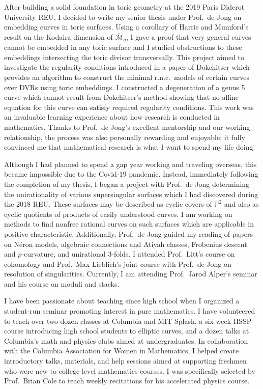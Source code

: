\documentclass[11pt]{article}
\begin{document}
\par
After building a solid foundation in toric geometry at the 2019 Paris Diderot University REU, I decided to write my senior thesis under Prof.\ de Jong on embedding curves in toric surfaces. Using a corollary of Harris and Mumford's result on the Kodaira dimension of $\overline{\mathcal{M}}_g$, I gave a proof that very general curves cannot be embedded in any toric surface and I studied obstructions to these embeddings intersecting the toric divisor transversally. This project aimed to investigate the regularity conditions introduced in a paper of Dokchitser  which provides an algorithm to construct the minimal r.n.c.\ models of certain curves over DVRs using toric embeddings. I constructed a degeneration of a genus 5 curve which cannot result from Dokchitser's method showing that no affine equation for this curve can satisfy required regularity conditions. This work was an invaluable learning experience about how research is conducted in mathematics. Thanks to Prof.\ de Jong’s excellent mentorship and our working relationship, the process was also personally rewarding and enjoyable; it fully convinced me that mathematical research is what I want to spend my life doing. 
\par 
Although I had planned to spend a gap year working and traveling overseas, this became impossible due to the Covid-19 pandemic. Instead, immediately following the completion of my thesis, I began a project with Prof.\ de Jong determining the unirationality of various supersingular surfaces which I had discovered during the 2018 REU. These surfaces may be described as cyclic covers of $\mathbb{P}^2$ and also as cyclic quotients of products of easily understood curves. I am working on methods to find nonfree rational curves on such surfaces which are applicable in positive characteristic. Additionally, Prof.\ de Jong guided my reading of papers on N\'{e}ron models, algebraic connections and Atiyah classes, Frobenius descent and $p$-curvature, and unirational $3$-folds. I attended Prof.\ Litt's course on \etale cohomology and Prof.\ Max Lieblich's joint course with Prof.\ de Jong on resolution of singularities. Currently, I am attending Prof.\ Jarod Alper’s seminar and his course on moduli and stacks.
\par
I have been passionate about teaching since high school when I organized a student-run seminar promoting interest in pure mathematics. I have volunteered to teach over two dozen classes at Columbia and MIT Splash, a six-week HSSP course introducing high school students to elliptic curves, and a dozen talks at Columbia's math and physics clubs aimed at undergraduates. In collaboration with the Columbia Association for Women in Mathematics, I helped create introductory talks, materials, and help sessions aimed at supporting freshmen who were new to college-level mathematics courses. I was specifically selected by Prof.\ Brian Cole to teach weekly recitations for his accelerated physics course.
\end{document}
